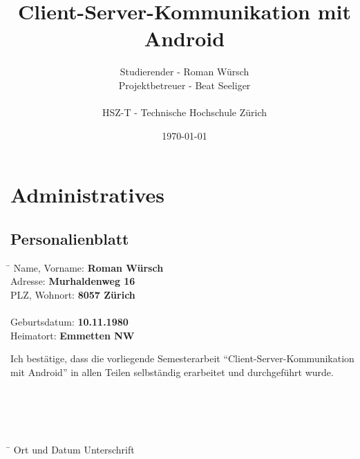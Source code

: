 \documentclass[listof=totocnumbered, bibliography=totocnumbered]{scrreprt}
\title{Client-Server-Kommunikation mit Android}
\author{Studierender - Roman Würsch\\
	Projektbetreuer - Beat Seeliger\\
	\\
	HSZ-T - Technische Hochschule Zürich}
\date{\today}
\begin{document}
  \ifpdf
  \else
  \fi
  
  
  \maketitle
  
  
  
  \tableofcontents
  
  
  \chapter{Administratives}
  
  \section{Personalienblatt}
  \begin{tabbing}
    \hspace*{6cm}\= \kill
    Name, Vorname: \> {\bf Roman Würsch} \\
    Adresse: \> {\bf Murhaldenweg 16} \\
    PLZ, Wohnort: \> {\bf 8057 Zürich} \\
    \\
    Geburtsdatum: \> {\bf 10.11.1980} \\
    Heimatort: \> {\bf Emmetten NW} \\
  \end{tabbing}
  Ich bestätige, dass die vorliegende Semesterarbeit
  ``Client-Server-Kommunikation mit Android'' in allen Teilen selbständig
  erarbeitet und durchgeführt wurde.
  \\
  \\
  \\
  \\
  \\
  \begin{tabbing}
    \hspace*{6cm}\= \kill
    Ort und Datum \> {Unterschrift} \\
  \end{tabbing}
  
\end{document}
